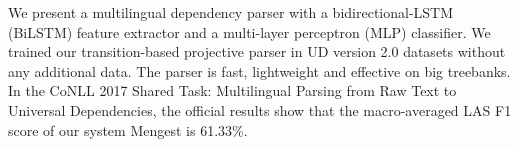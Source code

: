 We present a multilingual dependency parser with a bidirectional-LSTM (BiLSTM) feature extractor and a multi-layer perceptron (MLP) classifier. We trained our transition-based projective parser in UD version 2.0 datasets without any additional data. The parser is fast, lightweight and effective on big treebanks. In the CoNLL 2017 Shared Task: Multilingual Parsing from Raw Text to Universal Dependencies, the official results show that the macro-averaged LAS F1 score of our system Mengest is 61.33\%.
